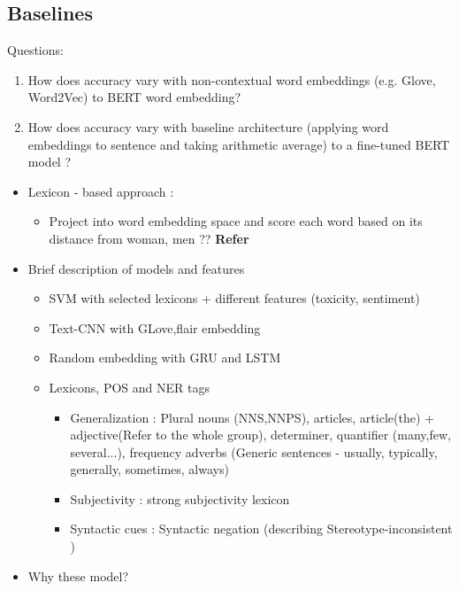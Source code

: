 \subsection{Baselines}

Questions:

\begin{enumerate}
    \item How does accuracy vary with non-contextual word embeddings (e.g. Glove, Word2Vec) to BERT word embedding?
    \item How does accuracy vary with baseline architecture (applying word embeddings to sentence and taking arithmetic average) to a fine-tuned BERT model ?
\end{enumerate}

    \begin{itemize}
        \item Lexicon - based approach : 
        \begin{itemize}
            \item Project into word embedding space and score each word based on its distance from woman, men ??
            \textbf{Refer }\cite{cryan2020detecting}
        \end{itemize}
        \item Brief description of  models and features
        \begin{itemize}
            \item SVM with selected lexicons + different features (toxicity, sentiment)
            \item Text-CNN with GLove,flair embedding
            \item Random embedding with GRU and LSTM 
        \end{itemize}
        \begin{itemize}
            \item Lexicons, POS and NER tags 
            \begin{itemize}
                \item Generalization : Plural nouns (NNS,NNPS), articles, article(the) + adjective(Refer to the whole group), determiner, quantifier (many,few, several...), frequency adverbs (Generic sentences - usually, typically, generally, sometimes, always)
                \item Subjectivity : strong subjectivity lexicon \cite{tangpersonalized}
                \item Syntactic cues : Syntactic negation (describing Stereotype-inconsistent )
            \end{itemize}
        \end{itemize}
        \item Why these model?
    \end{itemize}
